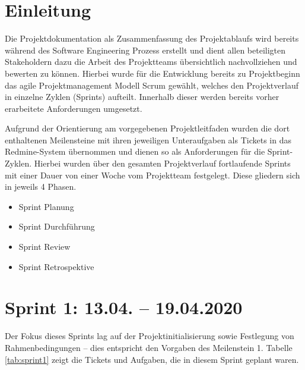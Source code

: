 \documentclass[a4paper,11pt,listof=numbered,glossary=totoc,parskip=half,toc=bib]{scrreprt}
\begin{document}
	
	\newpage
	\setcounter{tocdepth}{2}
	\tableofcontents	
	\renewcommand \thechapter{\Roman{chapter}}
	\listoftables
	\printglossaries
	\setcounter{lastRomanCounter}{\value{chapter}} %
	
	\newpage
	\renewcommand \thechapter{\arabic{chapter}}
	\setcounter{chapter}{0}
	
	\chapter{Einleitung}
	Die Projektdokumentation als Zusammenfassung des Projektablaufs wird bereits während des Software Engineering Prozess erstellt und dient allen beteiligten Stakeholdern dazu die Arbeit des Projektteams übersichtlich nachvollziehen und bewerten zu können. Hierbei wurde für die Entwicklung bereits zu Projektbeginn das agile Projektmanagement Modell Scrum gewählt, welches den Projektverlauf in einzelne Zyklen (Sprints) aufteilt. Innerhalb dieser werden bereits vorher erarbeitete Anforderungen umgesetzt. 
	
	Aufgrund der Orientierung am vorgegebenen Projektleitfaden wurden die dort enthaltenen Meilensteine mit ihren jeweiligen Unteraufgaben als Tickets in das Redmine-System übernommen und dienen so als Anforderungen für die Sprint-Zyklen. Hierbei wurden über den gesamten Projektverlauf fortlaufende Sprints mit einer Dauer von einer Woche vom Projektteam festgelegt. Diese gliedern sich in jeweils 4 Phasen.

\begin{itemize}
\item Sprint Planung
\item Sprint Durchführung
\item Sprint Review
\item Sprint Retrospektive
\end{itemize}



    \chapter{Sprint 1: 13.04. – 19.04.2020}
    
    Der Fokus dieses Sprints lag auf der Projektinitialisierung sowie Festlegung von Rahmenbedingungen – dies entspricht den Vorgaben des Meilenstein 1. Tabelle \ref{tab:sprint1} zeigt die Tickets und Aufgaben, die in diesem Sprint geplant waren.
    
\end{document}
